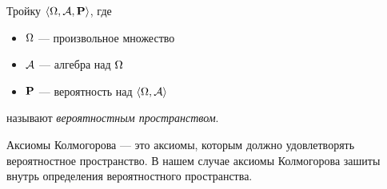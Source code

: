 \begin{definition}
	Тройку $\langle \Omega, \mathcal{A}, \mathbf{P} \rangle$, где
	\begin{itemize}
		\item $\Omega$ --- произвольное множество
		\item $\mathcal{A}$ --- \gm алгебра над $\Omega$
		\item $\mathbf{P}$ --- вероятность над $\langle \Omega, \mathcal{A} \rangle$
	\end{itemize}
	называют {\it вероятностным пространством}.
\end{definition}

Аксиомы Колмогорова --- это аксиомы, которым должно удовлетворять вероятностное пространство. В нашем случае аксиомы Колмогорова зашиты внутрь определения вероятностного пространства.